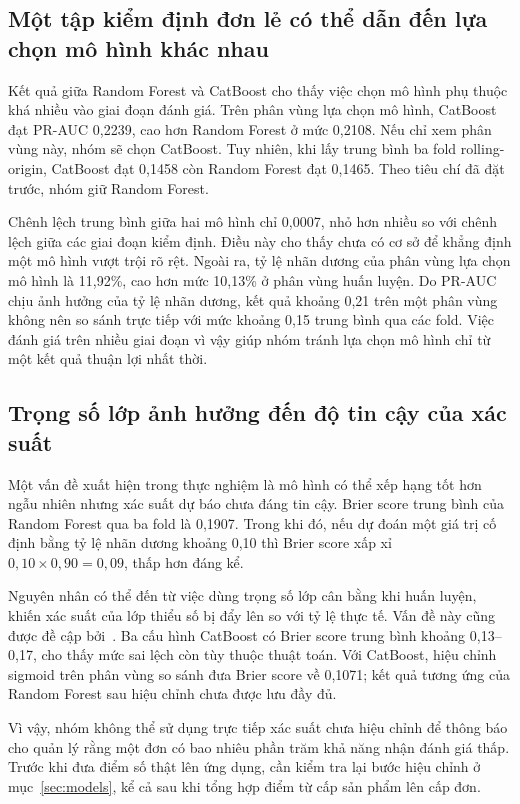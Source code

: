 \documentclass[12pt,a4paper]{report}
\begin{document}
\subsection{Một tập kiểm định đơn lẻ có thể dẫn đến lựa chọn mô hình khác nhau}

Kết quả giữa Random Forest và CatBoost cho thấy việc chọn mô hình phụ thuộc khá nhiều vào giai đoạn đánh giá. Trên phân vùng lựa chọn mô hình, CatBoost đạt PR-AUC 0,2239, cao hơn Random Forest ở mức 0,2108. Nếu chỉ xem phân vùng này, nhóm sẽ chọn CatBoost. Tuy nhiên, khi lấy trung bình ba fold rolling-origin, CatBoost đạt 0,1458 còn Random Forest đạt 0,1465. Theo tiêu chí đã đặt trước, nhóm giữ Random Forest.

Chênh lệch trung bình giữa hai mô hình chỉ 0,0007, nhỏ hơn nhiều so với chênh lệch giữa các giai đoạn kiểm định. Điều này cho thấy chưa có cơ sở để khẳng định một mô hình vượt trội rõ rệt. Ngoài ra, tỷ lệ nhãn dương của phân vùng lựa chọn mô hình là 11,92\%, cao hơn mức 10,13\% ở phân vùng huấn luyện. Do PR-AUC chịu ảnh hưởng của tỷ lệ nhãn dương, kết quả khoảng 0,21 trên một phân vùng không nên so sánh trực tiếp với mức khoảng 0,15 trung bình qua các fold. Việc đánh giá trên nhiều giai đoạn vì vậy giúp nhóm tránh lựa chọn mô hình chỉ từ một kết quả thuận lợi nhất thời.

\subsection{Trọng số lớp ảnh hưởng đến độ tin cậy của xác suất}

Một vấn đề xuất hiện trong thực nghiệm là mô hình có thể xếp hạng tốt hơn ngẫu nhiên nhưng xác suất dự báo chưa đáng tin cậy. Brier score trung bình của Random Forest qua ba fold là 0,1907. Trong khi đó, nếu dự đoán một giá trị cố định bằng tỷ lệ nhãn dương khoảng 0,10 thì Brier score xấp xỉ $0{,}10\times0{,}90=0{,}09$, thấp hơn đáng kể.

Nguyên nhân có thể đến từ việc dùng trọng số lớp cân bằng khi huấn luyện, khiến xác suất của lớp thiểu số bị đẩy lên so với tỷ lệ thực tế. Vấn đề này cũng được đề cập bởi~\textcite{vandengoorbergh2022}. Ba cấu hình CatBoost có Brier score trung bình khoảng 0,13--0,17, cho thấy mức sai lệch còn tùy thuộc thuật toán. Với CatBoost, hiệu chỉnh sigmoid trên phân vùng so sánh đưa Brier score về 0,1071; kết quả tương ứng của Random Forest sau hiệu chỉnh chưa được lưu đầy đủ.

Vì vậy, nhóm không thể sử dụng trực tiếp xác suất chưa hiệu chỉnh để thông báo cho quản lý rằng một đơn có bao nhiêu phần trăm khả năng nhận đánh giá thấp. Trước khi đưa điểm số thật lên ứng dụng, cần kiểm tra lại bước hiệu chỉnh ở mục~\ref{sec:models}, kể cả sau khi tổng hợp điểm từ cấp sản phẩm lên cấp đơn.
\end{document}
